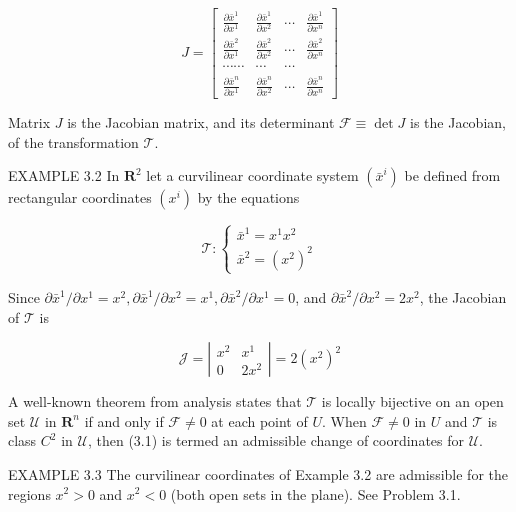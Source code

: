 \documentclass[10pt]{article}
\begin{document}
\[
J=\left[\begin{array}{cccc}
\frac{\partial \bar{x}^{1}}{\partial x^{1}} & \frac{\partial \bar{x}^{1}}{\partial x^{2}} & \cdots & \frac{\partial \bar{x}^{1}}{\partial x^{n}}  \tag{3.5}\\
\frac{\partial \bar{x}^{2}}{\partial x^{1}} & \frac{\partial \bar{x}^{2}}{\partial x^{2}} & \cdots & \frac{\partial \bar{x}^{2}}{\partial x^{n}} \\
\cdots \cdots & \cdots & \cdots \\
\frac{\partial \bar{x}^{n}}{\partial x^{1}} & \frac{\partial \bar{x}^{n}}{\partial x^{2}} & \cdots & \frac{\partial \bar{x}^{n}}{\partial x^{n}}
\end{array}\right]
\]

Matrix $J$ is the Jacobian matrix, and its determinant $\mathscr{F} \equiv \operatorname{det} J$ is the Jacobian, of the transformation $\mathscr{T}$.

EXAMPLE 3.2 In $\mathbf{R}^{2}$ let a curvilinear coordinate system $\left(\bar{x}^{i}\right)$ be defined from rectangular coordinates $\left(x^{i}\right)$ by the equations

$$
\mathscr{T}:\left\{\begin{array}{l}
\bar{x}^{1}=x^{1} x^{2} \\
\bar{x}^{2}=\left(x^{2}\right)^{2}
\end{array}\right.
$$

Since $\partial \bar{x}^{1} / \partial x^{1}=x^{2}, \partial \bar{x}^{1} / \partial x^{2}=x^{1}, \partial \bar{x}^{2} / \partial x^{1}=0$, and $\partial \bar{x}^{2} / \partial x^{2}=2 x^{2}$, the Jacobian of $\mathscr{T}$ is

$$
\mathscr{J}=\left|\begin{array}{cc}
x^{2} & x^{1} \\
0 & 2 x^{2}
\end{array}\right|=2\left(x^{2}\right)^{2}
$$

A well-known theorem from analysis states that $\mathscr{T}$ is locally bijective on an open set $\mathscr{U}$ in $\mathbf{R}^{n}$ if and only if $\mathscr{F} \neq 0$ at each point of $U$. When $\mathscr{F} \neq 0$ in $U$ and $\mathscr{T}$ is class $C^{2}$ in $\mathscr{U}$, then (3.1) is termed an admissible change of coordinates for $\mathcal{U}$.

EXAMPLE 3.3 The curvilinear coordinates of Example 3.2 are admissible for the regions $x^{2}>0$ and $x^{2}<0$ (both open sets in the plane). See Problem 3.1.
\end{document}
